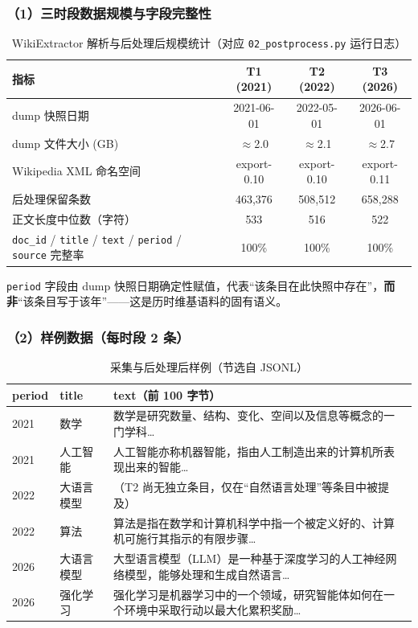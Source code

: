 \documentclass[12pt,a4paper]{article}
\begin{document}
\subsubsection*{（1）三时段数据规模与字段完整性}

\begin{table}[H]
\centering
\caption{WikiExtractor 解析与后处理后规模统计（对应 \texttt{02\_postprocess.py} 运行日志）}
\renewcommand{\arraystretch}{1.3}
\begin{tabular}{|l|c|c|c|}
\hline
\textbf{指标} & \textbf{T1 (2021)} & \textbf{T2 (2022)} & \textbf{T3 (2026)} \\
\hline
dump 快照日期 & 2021-06-01 & 2022-05-01 & 2026-06-01 \\
\hline
dump 文件大小 (GB) & $\approx$2.0 & $\approx$2.1 & $\approx$2.7 \\
\hline
Wikipedia XML 命名空间 & export-0.10 & export-0.10 & export-0.11 \\
\hline
后处理保留条数 & 463,376 & 508,512 & 658,288 \\
\hline
正文长度中位数（字符） & 533 & 516 & 522 \\
\hline
\texttt{doc\_id} / \texttt{title} / \texttt{text} / \texttt{period} / \texttt{source} 完整率 & 100\% & 100\% & 100\% \\
\hline
\end{tabular}
\end{table}

\texttt{period} 字段由 dump 快照日期确定性赋值，代表“该条目在此快照中存在”，\textbf{而非}“该条目写于该年”——这是历时维基语料的固有语义。

\subsubsection*{（2）样例数据（每时段 2 条）}

\begin{table}[H]
\centering
\small
\caption{采集与后处理后样例（节选自 JSONL）}
\renewcommand{\arraystretch}{1.3}
\begin{tabularx}{\textwidth}{|l|l|X|}
\hline
\textbf{period} & \textbf{title} & \textbf{text（前 100 字节）} \\
\hline
2021 & 数学 & 数学是研究数量、结构、变化、空间以及信息等概念的一门学科… \\
\hline
2021 & 人工智能 & 人工智能亦称机器智能，指由人工制造出来的计算机所表现出来的智能… \\
\hline
2022 & 大语言模型 & （T2 尚无独立条目，仅在“自然语言处理”等条目中被提及） \\
\hline
2022 & 算法 & 算法是指在数学和计算机科学中指一个被定义好的、计算机可施行其指示的有限步骤… \\
\hline
2026 & 大语言模型 & 大型语言模型（LLM）是一种基于深度学习的人工神经网络模型，能够处理和生成自然语言… \\
\hline
2026 & 强化学习 & 强化学习是机器学习中的一个领域，研究智能体如何在一个环境中采取行动以最大化累积奖励… \\
\hline
\end{tabularx}
\end{table}
\end{document}
